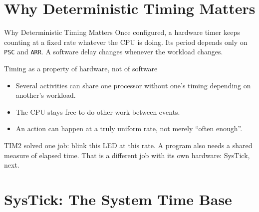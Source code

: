 \documentclass[9pt,aspectratio=169,xcolor=table]{beamer}
\begin{document}
\section{Why Deterministic Timing Matters}

\begin{frame}{Why Deterministic Timing Matters}
    \leavevmode
    Once configured, a hardware timer keeps counting at a fixed rate \alert{whatever the CPU is doing}. Its period depends only on \texttt{PSC} and \texttt{ARR}. A software delay changes whenever the workload changes.

    \vspace{3mm}
    \begin{block}{Timing as a property of hardware, not of software}
        {\small
        \begin{itemize}\itemsep2pt
            \item Several activities can share one processor without one's timing depending on another's workload.
            \item The CPU stays free to do other work between events.
            \item An action can happen at a truly \alert{uniform} rate, not merely ``often enough''.
        \end{itemize}}
    \end{block}

    \vspace{3mm}
    {\small TIM2 solved one job: blink this LED at this rate. A program also needs a shared measure of \alert{elapsed time}. That is a different job with its own hardware: SysTick, next.}
\end{frame}


\section{SysTick: The System Time Base}
\end{document}
